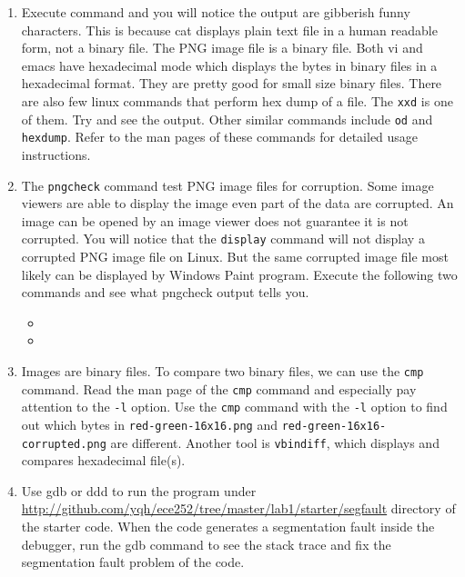 \begin{enumerate}
    \item Execute  command and you will notice the output are gibberish funny characters. This is because cat displays plain text file in a human readable form, not a binary file. The PNG image file is a binary file. Both vi and emacs have hexadecimal mode which displays the bytes in binary files in a hexadecimal format. They are pretty good for small size binary files. There are also few linux commands that perform hex dump of a file. The \verb+xxd+ is one of them. Try  and see the output. Other similar commands include \verb+od+ and \verb+hexdump+. Refer to the man pages of these commands for detailed usage instructions. 
    \item The \verb+pngcheck+ command test PNG image files for corruption. Some image viewers are able to display the image even part of the data are corrupted. An image can be opened by an image viewer does not guarantee it is not corrupted. You will notice that the \verb+display+ command will not display a corrupted PNG image file on Linux. But the same corrupted image file most likely can be displayed by Windows Paint program. Execute the following two commands and see what pngcheck output tells you.
      \begin{itemize}
      \item {}
      \item {}
      \end{itemize}
    \item Images are binary files. To compare two binary files, we can use the \verb+cmp+ command. Read the man page of the \verb+cmp+ command and especially pay attention to the \verb+-l+ option. Use the \verb+cmp+ command with the \verb+-l+ option to find out which bytes in \verb+red-green-16x16.png+ and \verb+red-green-16x16-corrupted.png+ are different. Another tool is \verb+vbindiff+, which displays and compares hexadecimal file(s).  
     \item Use gdb or ddd to run the program under \url{http://github.com/yqh/ece252/tree/master/lab1/starter/segfault} directory of the starter code. When the code generates a segmentation fault inside the debugger, run the gdb command  to see the stack trace and fix the segmentation fault problem of the code. 
\end{enumerate}

